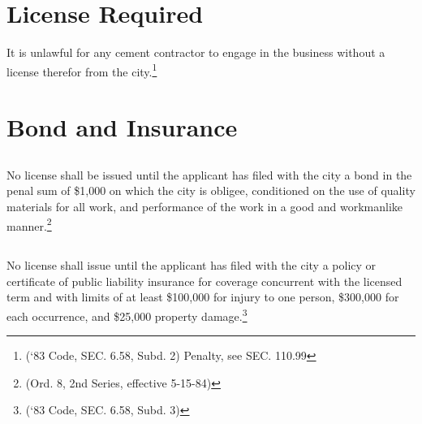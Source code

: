 \section{License Required}
It is unlawful for any cement contractor to engage in the business without a license therefor from the city.\footnote{(‘83 Code, SEC. 6.58, Subd. 2)  Penalty, see SEC. 110.99}

\section{Bond and Insurance}
\subsection{}
No license shall be issued until the applicant has filed with the city a bond in the penal sum of \$1,000 on which the city is obligee, conditioned on the use of quality materials for all work, and performance of the work in a good and workmanlike manner.\footnote{(Ord. 8, 2nd Series, effective 5-15-84)}
\subsection{}
No license shall issue until the applicant has filed with the city a policy or certificate of public liability insurance for coverage concurrent with the licensed term and with limits of at least \$100,000 for injury to one person, \$300,000 for each occurrence, and \$25,000 property damage.\footnote{(‘83 Code, SEC. 6.58, Subd. 3)}

